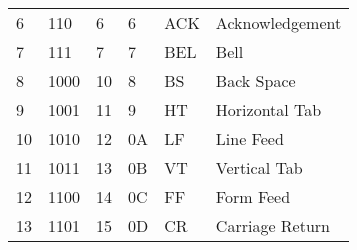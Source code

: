 \begin{center}
\begin{longtable}{llllll}
\rowcolor[HTML]{F3F6F6} 
{\color[HTML]{404040} 6}                & {\color[HTML]{404040} 110}             & {\color[HTML]{404040} 6}              & {\color[HTML]{404040} 6}                    & {\color[HTML]{404040} ACK}                & {\color[HTML]{404040} Acknowledgement}                       \\
\rowcolor[HTML]{FCFCFC} 
{\color[HTML]{404040} 7}                & {\color[HTML]{404040} 111}             & {\color[HTML]{404040} 7}              & {\color[HTML]{404040} 7}                    & {\color[HTML]{404040} BEL}                & {\color[HTML]{404040} Bell}                                  \\
\rowcolor[HTML]{F3F6F6} 
{\color[HTML]{404040} 8}                & {\color[HTML]{404040} 1000}            & {\color[HTML]{404040} 10}             & {\color[HTML]{404040} 8}                    & {\color[HTML]{404040} BS}                 & {\color[HTML]{404040} Back Space}                            \\
\rowcolor[HTML]{FCFCFC} 
{\color[HTML]{404040} 9}                & {\color[HTML]{404040} 1001}            & {\color[HTML]{404040} 11}             & {\color[HTML]{404040} 9}                    & {\color[HTML]{404040} HT}                 & {\color[HTML]{404040} Horizontal Tab}                        \\
\rowcolor[HTML]{F3F6F6} 
{\color[HTML]{404040} 10}               & {\color[HTML]{404040} 1010}            & {\color[HTML]{404040} 12}             & {\color[HTML]{404040} 0A}                   & {\color[HTML]{404040} LF}                 & {\color[HTML]{404040} Line Feed}                             \\
\rowcolor[HTML]{FCFCFC} 
{\color[HTML]{404040} 11}               & {\color[HTML]{404040} 1011}            & {\color[HTML]{404040} 13}             & {\color[HTML]{404040} 0B}                   & {\color[HTML]{404040} VT}                 & {\color[HTML]{404040} Vertical Tab}                          \\
\rowcolor[HTML]{F3F6F6} 
{\color[HTML]{404040} 12}               & {\color[HTML]{404040} 1100}            & {\color[HTML]{404040} 14}             & {\color[HTML]{404040} 0C}                   & {\color[HTML]{404040} FF}                 & {\color[HTML]{404040} Form Feed}                             \\
\rowcolor[HTML]{FCFCFC} 
{\color[HTML]{404040} 13}               & {\color[HTML]{404040} 1101}            & {\color[HTML]{404040} 15}             & {\color[HTML]{404040} 0D}                   & {\color[HTML]{404040} CR}                 & {\color[HTML]{404040} Carriage Return}                       \\

\end{longtable}
\end{center}
